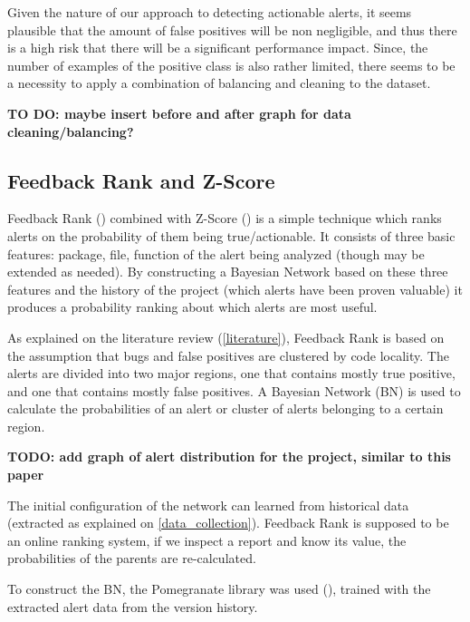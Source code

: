 Given the nature of our approach to detecting actionable alerts, it seems plausible that the amount of false positives will be non negligible, and thus there is a high risk that there will be a significant performance impact. Since, the number of examples of the positive class is also rather limited, there seems to be a necessity to apply a combination of balancing and cleaning to the dataset.

\textbf{TO DO: maybe insert before and after graph for data cleaning/balancing?}

\subsection{Feedback Rank and Z-Score}


Feedback Rank (\cite{correlation_exploitation}) combined with Z-Score (\cite{z-ranking}) is a simple technique which ranks alerts on the probability of them being true/actionable. It consists of three basic features: package, file, function of the alert being analyzed (though may be extended as needed).
By constructing a Bayesian Network based on these three features and the history of the project (which alerts have been proven valuable) it produces a probability ranking about which alerts are most useful.

As explained on the literature review (\cref{literature}), Feedback Rank is based on the assumption that bugs and false positives are clustered by code locality. The alerts are divided into two major regions, one that contains mostly true positive, and one that contains mostly false positives. A Bayesian Network (BN) is used to calculate the probabilities of an alert or cluster of alerts belonging to a certain region.

\textbf{TODO: add graph of alert distribution for the project, similar to this paper}

The initial configuration of the network can learned from historical data (extracted as explained on \cref{data_collection}). Feedback Rank is supposed to be an online ranking system, if we inspect a report and know its value, the probabilities of the parents are re-calculated.

To construct the BN, the Pomegranate library was used (\cite{pomegranate}), trained with the extracted alert data from the version history.

